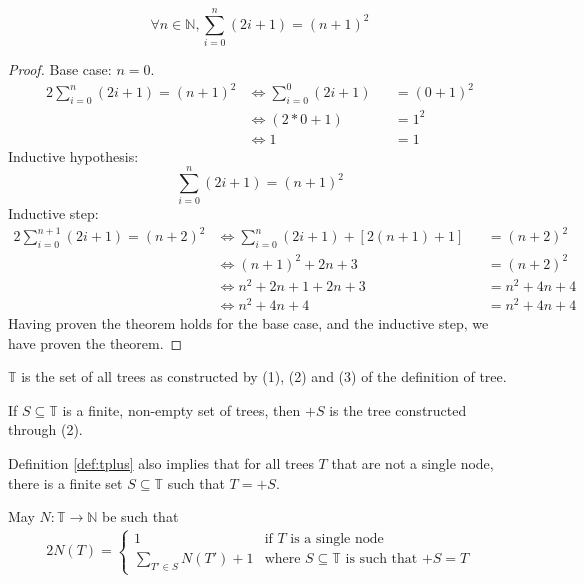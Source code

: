 \documentclass[docid=TP01]{tcom_TP}
\begin{document}
\setcounter{chapter}{0}
\begin{theorem}
	\begin{equation*}
		\forall n\in\mathbb{N},\sum_{i=0}^{n}{(2i+1)}=(n+1)^2
	\end{equation*}
\end{theorem}
\begin{proof}
	Base case: $n=0$.
\begin{alignat*}{2}
	\sum_{i=0}^{n}{(2i+1)}=(n+1)^2
	&\iff \sum_{i=0}^{0}{(2i+1)}&&=(0+1)^2 \\
    &\iff (2*0+1)               &&=1^2 \\
    &\iff 1                     &&=1
\end{alignat*}
Inductive hypothesis:
\begin{equation*}
	\sum_{i=0}^{n}{(2i+1)}=(n+1)^2
\end{equation*}
Inductive step:
\begin{alignat*}{2}
	\sum_{i=0}^{n+1}{(2i+1)}=(n+2)^2
	&\iff \sum_{i=0}^{n}{(2i+1)}+[2(n+1)+1]&&=(n+2)^2 \\
    &\iff (n+1)^2+2n+3                     &&=(n+2)^2 \\
    &\iff n^2+2n+1+2n+3                    &&=n^2+4n+4 \\
    &\iff n^2+4n+4                         &&=n^2+4n+4
\end{alignat*}
Having proven the theorem holds for the base case, and the inductive step, we have proven the theorem.
\end{proof}
\pagebreak
{}
\begin{definition}
	$\mathbb{T}$ is the set of all trees as constructed by (1), (2) and (3) of the definition of tree.
\end{definition}
\begin{definition}[Operator $+S$]
\label{def:tplus}
	If $S\subseteq\mathbb{T}$ is a finite, non-empty set of trees, then $+S$ is the tree constructed through (2).
\end{definition}
\begin{remark}
	Definition \ref{def:tplus} also implies that for all trees $T$ that are not a single node, there is a finite set $S\subseteq\mathbb{T}$ such that $T=+S$.
\end{remark}
\begin{definition}
	May $N\colon\mathbb{T}\rightarrow\mathbb{N}$ be such that
	\begin{alignat*}{2}
		N(T)= \begin{cases}
			  1                          & \text{if $T$ is a single node}\\
			  \sum_{T' \in S}{N(T')} + 1 & \text{where $S\subseteq\mathbb{T}$ is such that $+S=T$} 
			  \end{cases}
	\end{alignat*}
\end{definition}
\end{document}
